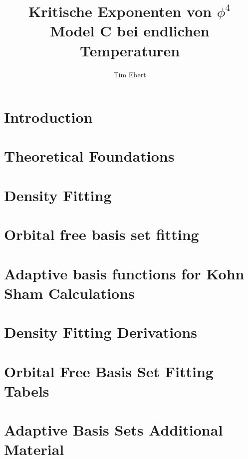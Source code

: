 \documentclass[12pt,twoside]{report}
\author{Tim Ebert}
\title{Kritische Exponenten von $\phi^4$ Model C bei endlichen Temperaturen}
\begin{document}
\linespread{1.25}

\newpage
\tableofcontents
\chapter{Introduction}

\chapter{Theoretical Foundations}

\chapter{Density Fitting}

\chapter{Orbital free basis set fitting}

\chapter{Adaptive basis functions for Kohn Sham Calculations}

\begin{appendices}
    \chapter{Density Fitting Derivations}
    
    \chapter{Orbital Free Basis Set Fitting Tabels}
    
    \chapter{Adaptive Basis Sets Additional Material}
    
\end{appendices}
\printbibliography[heading=bibintoc, title={Complete bibliography}]
\clearpage
\newpage
%
\end{document}
